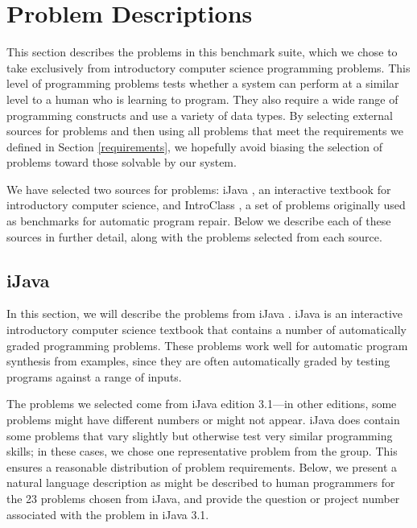 \documentclass{sig-alternate}
\begin{document}
\section{Problem Descriptions} \label{descriptionsSection}

This section describes the problems in this benchmark suite, which we chose to take exclusively from introductory computer science programming problems. This level of programming problems tests whether a system can perform at a similar level to a human who is learning to program. They also require a wide range of programming constructs and use a variety of data types. By selecting external sources for problems and then using all problems that meet the requirements we defined in Section \ref{requirements}, we hopefully avoid biasing the selection of problems toward those solvable by our system.

We have selected two sources for problems: iJava \cite{iJava}, an interactive textbook for introductory computer science, and IntroClass \cite{ManyBugsAndIntroClass, Brun13TRgptest}, a set of problems originally used as benchmarks for automatic program repair. Below we describe each of these sources in further detail, along with the problems selected from each source.

\subsection{iJava}

In this section, we will describe the problems from iJava \cite{iJava, Moll:2011:IOI:1968521.1968535}. iJava is an interactive introductory computer science textbook that contains a number of automatically graded programming problems. These problems work well for automatic program synthesis from examples, since they are often automatically graded by testing programs against a range of inputs.

The problems we selected come from iJava edition 3.1---in other editions, some problems might have different numbers or might not appear. iJava does contain some problems that vary slightly but otherwise test very similar programming skills; in these cases, we chose one representative problem from the group. This ensures a reasonable distribution of problem requirements. Below, we present a natural language description as might be described to human programmers for the 23 problems chosen from iJava, and provide the question or project number associated with the problem in iJava 3.1.
\end{document}
